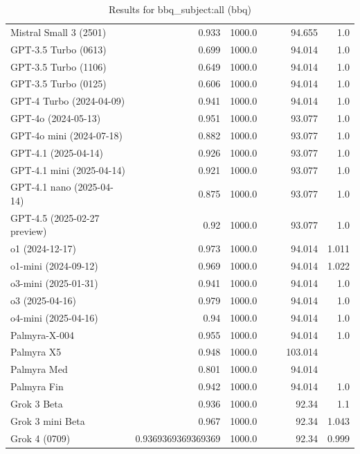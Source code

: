 \begin{table}[htp]
{\begin{tabular}{lrrrrrr}
Mistral Small 3 (2501) & 0.933 & 1000.0 &  &  & 94.655 & 1.0 \\
GPT-3.5 Turbo (0613) & 0.699 & 1000.0 &  &  & 94.014 & 1.0 \\
GPT-3.5 Turbo (1106) & 0.649 & 1000.0 &  &  & 94.014 & 1.0 \\
GPT-3.5 Turbo (0125) & 0.606 & 1000.0 &  &  & 94.014 & 1.0 \\
GPT-4 Turbo (2024-04-09) & 0.941 & 1000.0 &  &  & 94.014 & 1.0 \\
GPT-4o (2024-05-13) & 0.951 & 1000.0 &  &  & 93.077 & 1.0 \\
GPT-4o mini (2024-07-18) & 0.882 & 1000.0 &  &  & 93.077 & 1.0 \\
GPT-4.1 (2025-04-14) & 0.926 & 1000.0 &  &  & 93.077 & 1.0 \\
GPT-4.1 mini (2025-04-14) & 0.921 & 1000.0 &  &  & 93.077 & 1.0 \\
GPT-4.1 nano (2025-04-14) & 0.875 & 1000.0 &  &  & 93.077 & 1.0 \\
GPT-4.5 (2025-02-27 preview) & 0.92 & 1000.0 &  &  & 93.077 & 1.0 \\
o1 (2024-12-17) & 0.973 & 1000.0 &  &  & 94.014 & 1.011 \\
o1-mini (2024-09-12) & 0.969 & 1000.0 &  &  & 94.014 & 1.022 \\
o3-mini (2025-01-31) & 0.941 & 1000.0 &  &  & 94.014 & 1.0 \\
o3 (2025-04-16) & 0.979 & 1000.0 &  &  & 94.014 & 1.0 \\
o4-mini (2025-04-16) & 0.94 & 1000.0 &  &  & 94.014 & 1.0 \\
Palmyra-X-004 & 0.955 & 1000.0 &  &  & 94.014 & 1.0 \\
Palmyra X5 & 0.948 & 1000.0 &  &  & 103.014 &  \\
Palmyra Med & 0.801 & 1000.0 &  &  & 94.014 &  \\
Palmyra Fin & 0.942 & 1000.0 &  &  & 94.014 & 1.0 \\
Grok 3 Beta & 0.936 & 1000.0 &  &  & 92.34 & 1.1 \\
Grok 3 mini Beta & 0.967 & 1000.0 &  &  & 92.34 & 1.043 \\
Grok 4 (0709) & 0.9369369369369369 & 1000.0 &  &  & 92.34 & 0.999 \\
\bottomrule
\end{tabular}}
\caption{Results for bbq_subject:all (bbq)}
\label{fig:bbq_subject:all (bbq)}
\end{table}